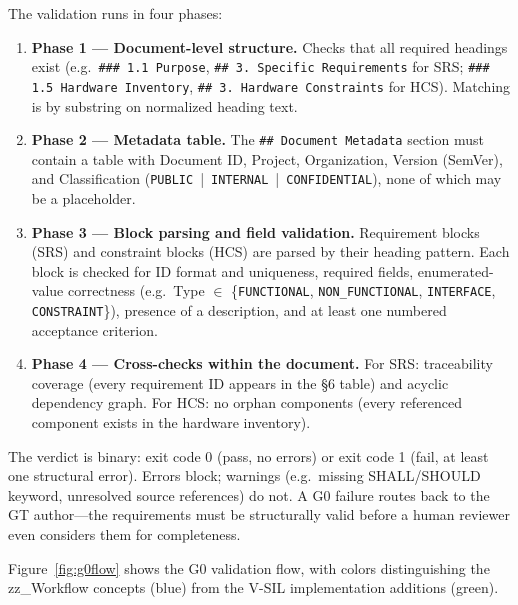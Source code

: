 \documentclass[11pt,a4paper]{article}
\begin{document}
The validation runs in four phases:

\begin{enumerate}
  \item \textbf{Phase 1 --- Document-level structure.} Checks that all required headings
    exist (e.g.\ \texttt{\#\#\# 1.1 Purpose}, \texttt{\#\# 3. Specific Requirements} for
    SRS; \texttt{\#\#\# 1.5 Hardware Inventory}, \texttt{\#\# 3. Hardware Constraints} for
    HCS). Matching is by substring on normalized heading text.
  \item \textbf{Phase 2 --- Metadata table.} The \texttt{\#\# Document Metadata} section
    must contain a table with Document ID, Project, Organization, Version (SemVer), and
    Classification (\texttt{PUBLIC}~|~\texttt{INTERNAL}~|~\texttt{CONFIDENTIAL}), none of
    which may be a placeholder.
  \item \textbf{Phase 3 --- Block parsing and field validation.} Requirement blocks (SRS)
    and constraint blocks (HCS) are parsed by their heading pattern. Each block is checked
    for ID format and uniqueness, required fields, enumerated-value correctness (e.g.\
    Type $\in$ \{\texttt{FUNCTIONAL}, \texttt{NON\_FUNCTIONAL}, \texttt{INTERFACE},
    \texttt{CONSTRAINT}\}), presence of a description, and at least one numbered acceptance
    criterion.
  \item \textbf{Phase 4 --- Cross-checks within the document.} For SRS: traceability
    coverage (every requirement ID appears in the \S6 table) and acyclic dependency graph.
    For HCS: no orphan components (every referenced component exists in the hardware
    inventory).
\end{enumerate}

The verdict is binary: exit code 0 (pass, no errors) or exit code 1 (fail, at least one
structural error). Errors block; warnings (e.g.\ missing SHALL/SHOULD keyword, unresolved
source references) do not. A G0 failure routes back to the GT author---the requirements must
be structurally valid before a human reviewer even considers them for completeness.

Figure~\ref{fig:g0flow} shows the G0 validation flow, with colors distinguishing the zz\_Workflow
concepts (blue) from the V-SIL implementation additions (green).
\end{document}
